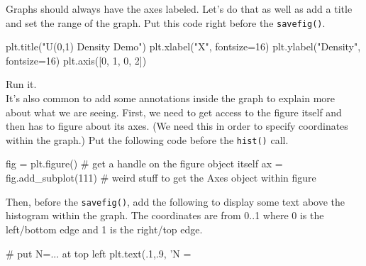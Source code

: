 \begin{fullwidth}

\step  Graphs should always have the axes labeled. Let's do that as well as add a title and set the range of the graph. Put this code right before the {\tt savefig()}.

\begin{pyverbatim}
plt.title("U(0,1) Density Demo")
plt.xlabel("X", fontsize=16)
plt.ylabel("Density", fontsize=16)
plt.axis([0, 1, 0, 2])
\end{pyverbatim}

\step Run it. \\

\step It's also common to add some annotations inside the graph to explain more about what we are seeing. First, we need to get access to the figure itself and then has to figure about its axes. (We need this in order to specify coordinates within the graph.) Put the following code before the {\tt hist()} call.

\begin{pyverbatim}
fig = plt.figure()        # get a handle on the figure object itself
ax = fig.add_subplot(111) # weird stuff to get the Axes object within figure
\end{pyverbatim}

Then, before the {\tt savefig()},  add the following to display some text above the histogram within the graph. The coordinates are from 0..1 where 0 is the left/bottom edge and 1 is the right/top edge.

\begin{pyverbatim}
# put N=... at top left
plt.text(.1,.9, 'N = %
\end{pyverbatim}


\end{fullwidth}
